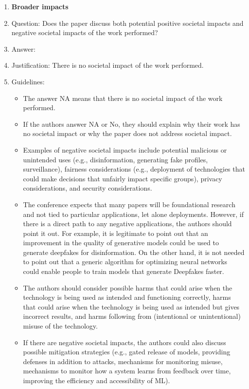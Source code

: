 \documentclass{article}
\theoremstyle{plain}
\begin{document}
\begin{enumerate}
\item {\bf Broader impacts}
    \item[] Question: Does the paper discuss both potential positive societal impacts and negative societal impacts of the work performed?
    \item[] Answer: \answerNA{}
    \item[] Justification: There is no societal impact of the work performed.
    \item[] Guidelines:
    \begin{itemize}
        \item The answer NA means that there is no societal impact of the work performed.
        \item If the authors answer NA or No, they should explain why their work has no societal impact or why the paper does not address societal impact.
        \item Examples of negative societal impacts include potential malicious or unintended uses (e.g., disinformation, generating fake profiles, surveillance), fairness considerations (e.g., deployment of technologies that could make decisions that unfairly impact specific groups), privacy considerations, and security considerations.
        \item The conference expects that many papers will be foundational research and not tied to particular applications, let alone deployments. However, if there is a direct path to any negative applications, the authors should point it out. For example, it is legitimate to point out that an improvement in the quality of generative models could be used to generate deepfakes for disinformation. On the other hand, it is not needed to point out that a generic algorithm for optimizing neural networks could enable people to train models that generate Deepfakes faster.
        \item The authors should consider possible harms that could arise when the technology is being used as intended and functioning correctly, harms that could arise when the technology is being used as intended but gives incorrect results, and harms following from (intentional or unintentional) misuse of the technology.
        \item If there are negative societal impacts, the authors could also discuss possible mitigation strategies (e.g., gated release of models, providing defenses in addition to attacks, mechanisms for monitoring misuse, mechanisms to monitor how a system learns from feedback over time, improving the efficiency and accessibility of ML).
    \end{itemize}
    

\end{enumerate}
\end{document}
